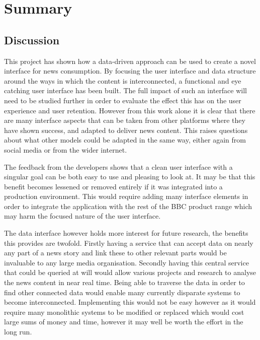 \documentclass[12pt,titlepage]{article}
\begin{document}
\section{Summary}

  \subsection{Discussion}

  This project has shown how a data-driven approach can be used to create a
  novel interface for news consumption. By focusing the user interface and data
  structure around the ways in which the content is interconnected, a functional
  and eye catching user interface has been built. The full impact of such an
  interface will need to be studied further in order to evaluate the effect this
  has on the user experience and user retention. However from this work alone it
  is clear that there are many interface aspects that can be taken from other
  platforms where they have shown success, and adapted to deliver news content.
  This raises questions about what other models could be adapted in the same
  way, either again from social media or from the wider internet.

  The feedback from the developers shows that a clean user interface with a
  singular goal can be both easy to use and pleasing to look at. It may be that
  this benefit becomes lessened or removed entirely if it was integrated into a
  production environment. This would require adding many interface elements in
  order to integrate the application with the rest of the BBC product range
  which may harm the focused nature of the user interface.

  The data interface however holds more interest for future research, the
  benefits this provides are twofold. Firstly having a service that can accept
  data on nearly any part of a news story and link these to other relevant parts
  would be invaluable to any large media organisation. Secondly having this
  central service that could be queried at will would allow various projects and
  research to analyse the news content in near real time. Being able to traverse
  the data in order to find other connected data would enable many currently
  disparate systems to become interconnected. Implementing this would not be
  easy however as it would require many monolithic systems to be modified or
  replaced which would cost large sums of money and time, however it may well be
  worth the effort in the long run.
\end{document}
